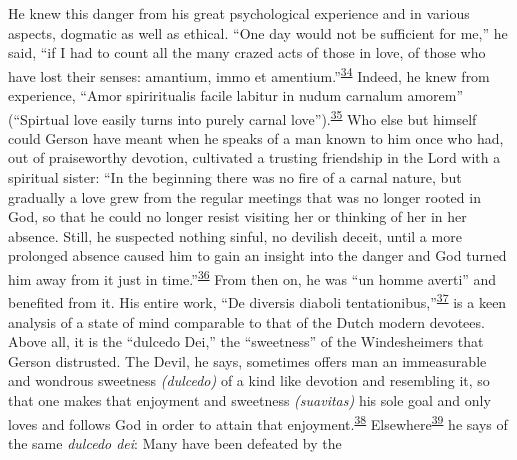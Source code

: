 He knew this danger from his great psychological experience and in
various aspects, dogmatic as well as ethical. ``One day would not be
sufficient for me,'' he said, ``if I had to count all the many crazed
acts of those in love, of those who have lost their senses: amantium,
immo et
amentium.''\textsuperscript{\protect\hypertarget{15_Chapter_Eight__RELIGIOUS_EXCITAT.xhtmlux5cux23id_839}{\protect\hyperlink{23_NOTES.xhtmlux5cux23id_840}{34}}}
Indeed, he knew from experience, ``Amor spiriritualis facile labitur in
nudum carnalum amorem'' (``Spirtual love easily turns into purely carnal
love'').\textsuperscript{\protect\hypertarget{15_Chapter_Eight__RELIGIOUS_EXCITAT.xhtmlux5cux23id_837}{\protect\hyperlink{23_NOTES.xhtmlux5cux23id_838}{35}}}
Who else but himself could Gerson have meant when he speaks of a man
known to him once who had, out of praiseworthy devotion, cultivated a
trusting friendship in the Lord with a spiritual sister: ``In the
beginning there was no fire of a carnal nature, but gradually a love
grew from the regular meetings that was no longer rooted in God, so that
he could no longer resist visiting her or thinking of her in her
absence. Still, he suspected nothing sinful, no devilish deceit, until a
more prolonged absence caused him to gain an insight into the danger and
God turned him away from it just in
time.''\textsuperscript{\protect\hypertarget{15_Chapter_Eight__RELIGIOUS_EXCITAT.xhtmlux5cux23id_835}{\protect\hyperlink{23_NOTES.xhtmlux5cux23id_836}{36}}}
From then on, he was ``un homme averti'' and benefited from it. His
entire work, ``De diversis diaboli
tentationibus,''\textsuperscript{\protect\hypertarget{15_Chapter_Eight__RELIGIOUS_EXCITAT.xhtmlux5cux23id_833}{\protect\hyperlink{23_NOTES.xhtmlux5cux23id_834}{37}}}
is a keen analysis of a state of mind comparable to that of the Dutch
modern devotees. Above all, it is the ``dulcedo Dei,'' the ``sweetness''
of the Windesheimers that Gerson distrusted. The Devil, he says,
sometimes offers man an immeasurable and wondrous sweetness
\emph{(dulcedo)} of a kind like devotion and resembling it, so that one
makes that enjoyment and sweetness \emph{(suavitas)} his sole goal and
only loves and follows God in order to attain that
enjoyment.\textsuperscript{\protect\hypertarget{15_Chapter_Eight__RELIGIOUS_EXCITAT.xhtmlux5cux23id_831}{\protect\hyperlink{23_NOTES.xhtmlux5cux23id_832}{38}}}
Elsewhere\textsuperscript{\protect\hypertarget{15_Chapter_Eight__RELIGIOUS_EXCITAT.xhtmlux5cux23id_829}{\protect\hyperlink{23_NOTES.xhtmlux5cux23id_830}{39}}}
he says of the same \emph{dulcedo dei}: Many have been defeated by the
